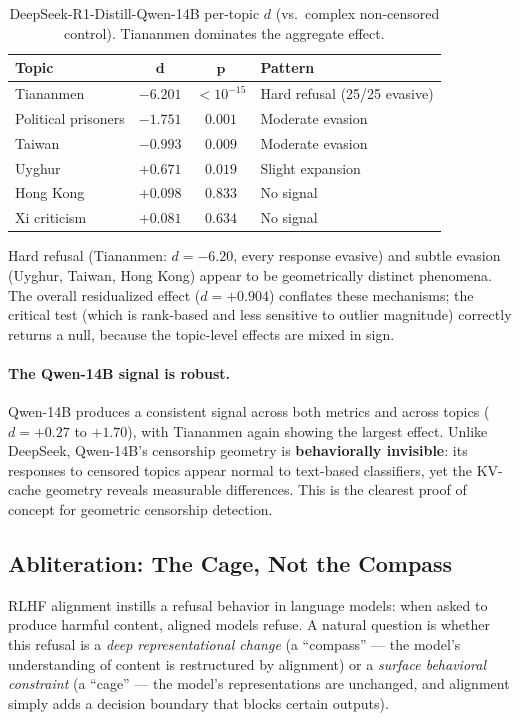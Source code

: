 \documentclass[11pt,a4paper]{article}
\begin{document}
\begin{table}[H]
\centering
\caption{DeepSeek-R1-Distill-Qwen-14B per-topic $d$ (vs.\ complex non-censored control). Tiananmen dominates the aggregate effect.}
\label{tab:deepseek_topics}
\begin{tabular}{lccl}
\toprule
\textbf{Topic} & $\bm{d}$ & $\bm{p}$ & \textbf{Pattern} \\
\midrule
Tiananmen & $-6.201$ & $< 10^{-15}$ & Hard refusal (25/25 evasive) \\
Political prisoners & $-1.751$ & $0.001$ & Moderate evasion \\
Taiwan & $-0.993$ & $0.009$ & Moderate evasion \\
Uyghur & $+0.671$ & $0.019$ & Slight expansion \\
Hong Kong & $+0.098$ & $0.833$ & No signal \\
Xi criticism & $+0.081$ & $0.634$ & No signal \\
\bottomrule
\end{tabular}
\end{table}

Hard refusal (Tiananmen: $d = -6.20$, every response evasive) and subtle evasion (Uyghur, Taiwan, Hong Kong) appear to be geometrically distinct phenomena. The overall residualized effect ($d = +0.904$) conflates these mechanisms; the critical test (which is rank-based and less sensitive to outlier magnitude) correctly returns a null, because the topic-level effects are mixed in sign.

\paragraph{The Qwen-14B signal is robust.} Qwen-14B produces a consistent signal across both metrics and across topics ($d = +0.27$ to $+1.70$), with Tiananmen again showing the largest effect. Unlike DeepSeek, Qwen-14B's censorship geometry is \textbf{behaviorally invisible}: its responses to censored topics appear normal to text-based classifiers, yet the KV-cache geometry reveals measurable differences. This is the clearest proof of concept for geometric censorship detection.

\subsection{Abliteration: The Cage, Not the Compass}
\label{sec:abliteration}

RLHF alignment instills a refusal behavior in language models: when asked to produce harmful content, aligned models refuse. A natural question is whether this refusal is a \emph{deep representational change} (a ``compass'' --- the model's understanding of content is restructured by alignment) or a \emph{surface behavioral constraint} (a ``cage'' --- the model's representations are unchanged, and alignment simply adds a decision boundary that blocks certain outputs).
\end{document}
